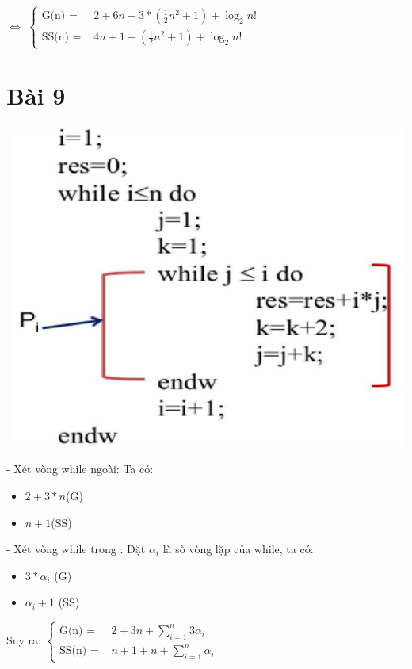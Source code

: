 \documentclass{article}
\newcommand\tab[1][1cm]{\hspace*{#1}}
\begin{document}
\tab $\Leftrightarrow $
\(
\begin{cases}
    \text{G(n) = } & 2 + 6n -  3*(\frac{1}{2}n^2 + 1) + \log_{2}{n!} \\
    \text{SS(n) = } &  4n + 1  - (\frac{1}{2}n^2 + 1) + \log_{2}{n!} 
\end{cases}
\)

\newpage
\section*{Bài 9}
\includegraphics[scale=0.5]{bai9}

- Xét vòng while ngoài:
Ta có:
\begin{itemize}
    \item $ 2 + 3*n $(G)
    \item $ n + 1 $(SS)
\end{itemize}

- Xét vòng while trong :
Đặt $\alpha_{i}$ là số vòng lặp của while, ta có:
\begin{itemize}
    \item $ 3*\alpha_{i}$ (G)
    \item $ \alpha_{i} + 1$ (SS)
\end{itemize}

\vspace{15mm}

\tab Suy ra:
\(
\begin{cases}
    \text{G(n) = } & 2 + 3n +  \sum\limits_{i=1}^{n}3\alpha_{i} \\
    \text{SS(n) = } &  n + 1 + n  + \sum\limits_{i=1}^{n}\alpha_{i} 
\end{cases}
\)
\end{document}
